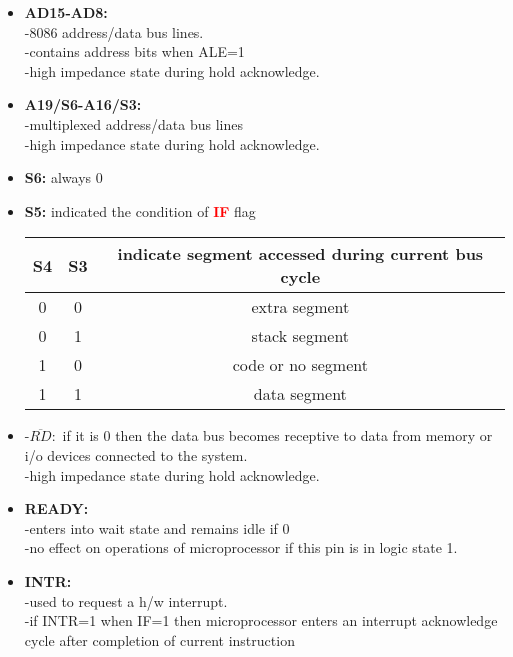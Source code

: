 \documentclass[12pt]{article}
\begin{document}
\begin{itemize}
\begin{itemize}
		\item \textbf{AD15-AD8:}\\
		-8086 address/data bus lines.\\
		-contains address bits when ALE=1\\
		-high impedance state during hold acknowledge.\\
		
		\item \textbf{A19/S6-A16/S3:}\\
		-multiplexed address/data bus lines\\
		-high impedance state during hold acknowledge.\\
		
		\item\textbf{S6:} always 0\\
		\item\textbf{S5:} indicated the condition of \textbf{\textcolor{red}{IF}} flag\\
		
		\begin{table}[H]
			\begin{tabular}{|c|c|c|}
				\hline
				S4 & S3 & indicate segment accessed  during current bus cycle\\\hline
				
				0 & 0 & extra segment\\\hline
				0 & 1 & stack segment\\\hline
				1 & 0 & code or no segment\\\hline
				1 & 1 & data segment\\\hline
			\end{tabular}
		\end{table}
	
		\item -$\overline{RD}:$ if it is 0 then the data bus becomes receptive to data from memory or i/o devices connected to the system.\\
		-high impedance state during hold acknowledge.\\
		
		\item\textbf{READY:}\\
		-enters into wait state and remains idle if 0\\
		-no effect on operations of microprocessor if this pin is in logic state 1.\\
		
		\item\textbf{INTR:}\\
		-used to request a h/w interrupt.\\
		-if INTR=1 when IF=1 then microprocessor enters an interrupt acknowledge cycle after completion of current instruction\\
		

\end{itemize}
\end{itemize}
\end{document}

